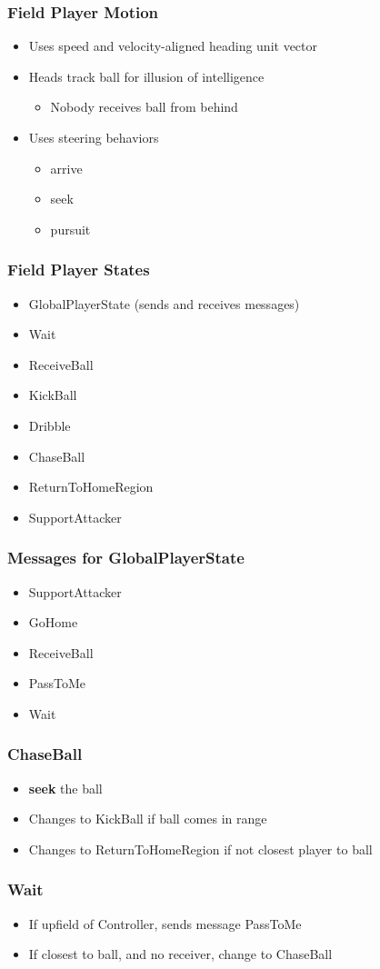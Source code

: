 \documentclass[handout,t,compress]{beamer}
\newcommand{\bframe}[1]{\begin{frame}[fragile]\frametitle{{#1}}}
\newcommand{\bi}{\begin{itemize}}
\newcommand{\li}{\item}
\newcommand{\ei}{\end{itemize}}
\begin{document}
\bframe{Field Player Motion}
\bi
\li Uses speed and velocity-aligned heading unit vector
\li Heads track ball for illusion of intelligence
\bi\li Nobody receives ball from behind \ei
\li Uses steering behaviors
\bi\li arrive\li seek\li pursuit\ei
\ei
\end{frame}

\bframe{Field Player States}
\begin{itemize}
\item GlobalPlayerState (sends and receives messages)
\item Wait
\item ReceiveBall
\item KickBall
\item Dribble
\item ChaseBall
\item ReturnToHomeRegion
\item SupportAttacker
\end{itemize}
\end{frame}

\bframe{Messages for GlobalPlayerState}
\begin{itemize}
\item SupportAttacker
\item GoHome
\item ReceiveBall
\item PassToMe
\item Wait
\end{itemize}
\end{frame}

\bframe{ChaseBall}
\begin{itemize}
\item {\bf seek} the ball
\item Changes to KickBall if ball comes in range
\item Changes to ReturnToHomeRegion if not closest player to ball
\end{itemize}
\end{frame}

\bframe{Wait}
\begin{itemize}
\item If upfield of Controller, sends message PassToMe
\item If closest to ball, and no receiver, change to ChaseBall
\end{itemize}
\end{frame}
\end{document}
